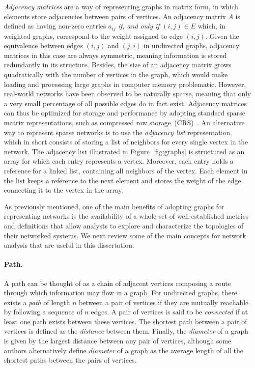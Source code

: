 \textit{Adjacency matrices} are a way of representing graphs in matrix form, in which elements store adjacencies between pairs of vertices.
An adjacency matrix $A$ is defined as having non-zero entries $a_{i j}$\textit{ if, and only if } $(i,j)\in E$ which, in weighted graphs, correspond to the weight assigned to edge $(i,j)$.
Given the equivalence between edges $(i,j)$ and $(j,i)$ in undirected graphs, adjacency matrices in this case are always symmetric, meaning information is stored redundantly in its structure.
%
Besides, the size of an adjacency matrix grows quadratically with the number of vertices in the graph, which would make loading and processing large graphs in computer memory problematic.
However, real-world networks have been observed to be naturally sparse, meaning that only a very small percentage of all possible edges do in fact exist.
Adjacency matrices can thus be optimized for storage and performance by adopting standard sparse matrix representations, such as compressed row storage~(CRS)~\cite{Saad2003}.
An alternative way to represent sparse networks is to use the \textit{adjacency list} representation, which in short consists of storing a list of neighbors for every single vertex in the network. 
The adjacency list illustrated in Figure~\ref{fig:graphs} is structured as an array for which each entry represents a vertex.
Moreover, each entry holds a reference for a linked list, containing all neighbors of the vertex. Each element in the list keeps a reference to the next element and stores the weight of the edge connecting it to the vertex in the array.

As previously mentioned, one of the main benefits of adopting graphs for representing networks is the availability of a whole set of well-established metrics and definitions that allow analysts to explore and characterize the topologies of their networked systems.
We next review some of the main concepts for network analysis that are useful in this dissertation.

\paragraph*{Path.}
A path can be thought of as a chain of adjacent vertices composing a route through which information may flow in a graph.
For undirected graphs, there exists a \textit{path} of length $n$ between a pair of vertices if they are mutually reachable by following a sequence of $n$ edges.
A pair of vertices is said to be \textit{connected} if at least one path exists between these vertices. The shortest path between a pair of vertices is defined as the \textit{distance} between them.
Finally, the \textit{diameter} of a graph is given by the largest distance between any pair of vertices, although some authors alternatively define \textit{diameter} of a graph as the average length of all the shortest paths between the pairs of vertices.

